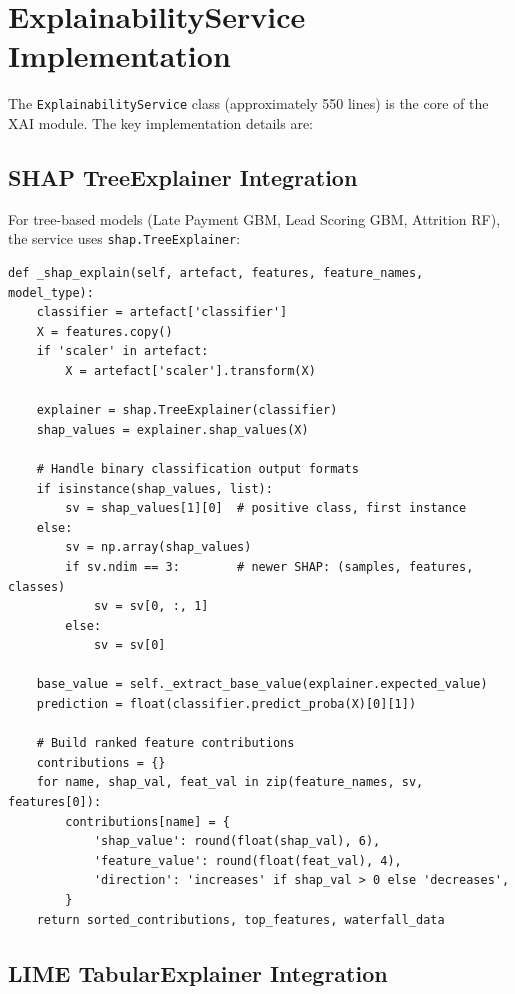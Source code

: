 \documentclass[12pt,a4paper]{report}
\begin{document}
\section{ExplainabilityService Implementation}
\label{sec:xai_implementation}

The \texttt{ExplainabilityService} class (approximately 550 lines) is the core of the XAI module. The key implementation details are:

\subsection{SHAP TreeExplainer Integration}

For tree-based models (Late Payment GBM, Lead Scoring GBM, Attrition RF), the service uses \texttt{shap.TreeExplainer}:

\begin{lstlisting}[caption={SHAP instance explanation (simplified)},label={lst:shap_explain}]
def _shap_explain(self, artefact, features, feature_names, model_type):
    classifier = artefact['classifier']
    X = features.copy()
    if 'scaler' in artefact:
        X = artefact['scaler'].transform(X)

    explainer = shap.TreeExplainer(classifier)
    shap_values = explainer.shap_values(X)

    # Handle binary classification output formats
    if isinstance(shap_values, list):
        sv = shap_values[1][0]  # positive class, first instance
    else:
        sv = np.array(shap_values)
        if sv.ndim == 3:        # newer SHAP: (samples, features, classes)
            sv = sv[0, :, 1]
        else:
            sv = sv[0]

    base_value = self._extract_base_value(explainer.expected_value)
    prediction = float(classifier.predict_proba(X)[0][1])

    # Build ranked feature contributions
    contributions = {}
    for name, shap_val, feat_val in zip(feature_names, sv, features[0]):
        contributions[name] = {
            'shap_value': round(float(shap_val), 6),
            'feature_value': round(float(feat_val), 4),
            'direction': 'increases' if shap_val > 0 else 'decreases',
        }
    return sorted_contributions, top_features, waterfall_data
\end{lstlisting}

\subsection{LIME TabularExplainer Integration}
\end{document}
